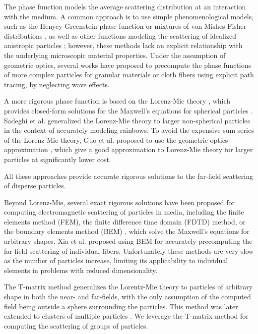 The phase function models the average scattering distribution at an interaction with the medium. A common approach is to use simple phenomenological models, such as the Henyey-Greenstein phase function \cite{henyey1941diffuse} or mixtures of von Mishes-Fisher distributions \cite{gkioulekas2013understanding}, as well as other functions modeling the scattering of idealized anistropic particles \cite{zhao2011building,heitz2015sggx}; however, these methods lack an explicit relationship with the underlying microscopic material properties. Under the assumption of geometric optics, several works have proposed to precompute the phase functions of more complex particles for granular materials \cite{meng2015multi,muller2016efficient} or cloth fibers \cite{aliaga2017appearance} using explicit path tracing, by neglecting wave effects. 

A more rigorous phase function is based on the Lorenz-Mie theory \cite{hulst1981light}, which provides closed-form solutions for the Maxwell's equations for spherical particles \cite{jackel1997modeling,frisvad2007computing}. Sadeghi et al. \cite{sadeghi2012physically} generalized the Lorenz-Mie theory to larger non-spherical particles in the context of accurately modeling rainbows. To avoid the expensive sum series of the Lorenz-Mie theory, Guo et al. \cite{guo2021rendering} proposed to use the geometric optics approximation \cite{glantschnig1981light}, which give a good approximation to Lorenz-Mie theory for larger particles at significantly lower cost. 

All these approaches provide accurate rigorous solutions to the far-field scattering of disperse particles. 

Beyond Lorenz-Mie, several exact rigorous solutions have been proposed for computing  electromagnetic scattering of particles in media, including the finite elements method (FEM), the finite difference time domain (FDTD) method, or the boundary elements method (BEM) \cite{wu1977scattering}, which solve the Maxwell's equations for arbitrary shapes. Xia et al. \cite{xia2020wave} proposed using BEM for accurately precomputing the far-field scattering of individual fibers. Unfortunately these methods are very slow as the number of particles increase, limiting its applicability to individual elements in problems with reduced dimensionality. 

The T-matrix method \cite{waterman1965matrix} generalizes the Lorentz-Mie theory to particles of arbitrary shape in both the near- and far-fields, with the only assumption of the computed field being outside a sphere surrounding the particles. This method was later extended to clusters of multiple particles \cite{peterson1973t,mackowski2011multiple}. We leverage the T-matrix method for computing the scattering of groups of particles. 

